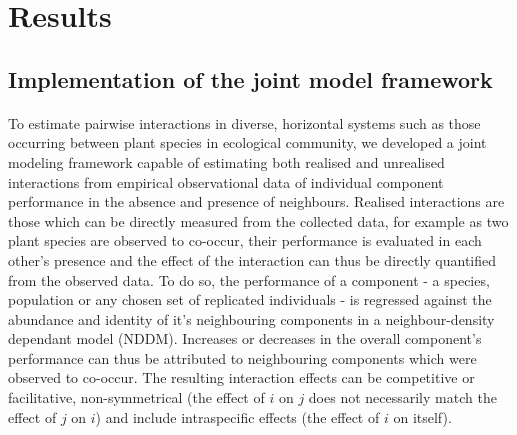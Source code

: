 \documentclass[a4,12pt]{article}
\begin{document}


\section{Results}

    \subsection{Implementation of the joint model framework}

\paragraph{}
    To estimate pairwise interactions in diverse, horizontal systems such as those occurring between plant species in ecological community, we developed a joint modeling framework capable of estimating both realised and unrealised interactions from empirical observational data of individual component performance in the absence and presence of neighbours. Realised interactions are those which can be directly measured from the collected data, for example as two plant species are observed to co-occur, their performance is evaluated in each other's presence and the effect of the interaction can thus be directly quantified from the observed data. To do so, the performance of a component - a species, population or any chosen set of replicated individuals - is regressed against the abundance and identity of it's neighbouring components in a neighbour-density dependant model (NDDM). Increases or decreases in the overall component's performance can thus be attributed to neighbouring components which were observed to co-occur. The resulting interaction effects can be competitive or facilitative, non-symmetrical (the effect of $i$ on $j$ does not necessarily match the effect of $j$ on $i$) and include intraspecific effects (the effect of $i$ on itself). 
\end{document}
